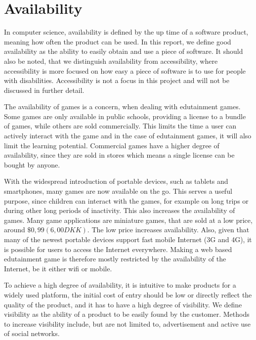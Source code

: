 \section{Availability}
\label{sec:availability}

In computer science, availability is defined by the up time of a software product, meaning how often the product can be used.\cite{defAvailability}
In this report, we define good availability as the ability to easily obtain and use a piece of software.
It should also be noted, that we distinguish availability from accessibility, where accessibility is more focused on how easy a piece of software is to use for people with disabilities.
Accessibility is not a focus in this project and will not be discussed in further detail.\newline

The availability of games is a concern, when dealing with edutainment games.
Some games are only available in public schools, providing a license to a bundle of games, while others are sold commercially.
This limits the time a user can actively interact with the game and in the case of edutainment games, it will also limit the learning potential.
Commercial games have a higher degree of availability, since they are sold in stores which means a single license can be bought by anyone.\newline

With the widespread introduction of portable devices, such as tablets and smartphones, many games are now available on the go.
This serves a useful purpose, since children can interact with the games, for example on long trips or during other long periods of inactivity.
This also increases the availability of games.
Many game applications are miniature games, that are sold at a low price, around $\$0,99 (6,00 DKK)$.
The low price increases availability.
Also, given that many of the newest portable devices support fast mobile Internet (3G and 4G), it is possible for users to access the Internet everywhere.
Making a web based edutainment game is therefore mostly restricted by the availability of the Internet, be it either wifi or mobile.\newline

To achieve a high degree of availability, it is intuitive to make products for a widely used platform, the initial cost of entry should be low or directly reflect the quality of the product, and it has to have a high degree of visibility.
We define visibility as the ability of a product to be easily found by the customer.
Methods to increase visibility include, but are not limited to, advertisement and active use of social networks.